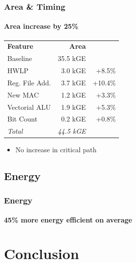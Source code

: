 \documentclass{beamer}
\newcommand\drawbar[1]{%
  \begin{tikzpicture}%
    \draw[fill=#1,draw=black!90,ultra thin] (0pt,0pt) rectangle (3pt,8pt);%
    \draw[fill=#1,draw=black!90,ultra thin] (6pt,0pt) rectangle (9pt,6pt);%
  \end{tikzpicture}\hspace{0pt}%
}
\begin{document}
\begin{frame}
  \frametitle{Area \& Timing}
  \framesubtitle{Area increase by 25\%}
  \begin{minipage}[c][5cm]{0.58\linewidth}
    \begin{tabular}{@{}lrr@{}}
      \textbf{Feature}  & \textbf{Area}    & \\ \Xhline{2\arrayrulewidth}
      \drawbar{gray!20}   Baseline         & 35.5 kGE &         \\ \hline
      \drawbar{blue!60}   HWLP             &  3.0 kGE &  +8.5\%   \\ \hline
      \drawbar{blue!60}   Reg. File Add.   &  3.7 kGE & +10.4\%   \\ \hline
      \drawbar{red!60}    New MAC          &  1.2 kGE &  +3.3\%   \\ \hline
      \drawbar{orange!60} Vectorial ALU    &  1.9 kGE &  +5.3\%   \\ \hline
      \drawbar{green!60}  Bit Count        &  0.2 kGE &  +0.8\%   \\ \Xhline{3\arrayrulewidth}
                          \textit{Total}   & \textit{44.5 kGE} & 
    \end{tabular}
    \vfill
    \begin{itemize}
      \item No increase in critical path
    \end{itemize}
  \end{minipage}
  \hfill
  \begin{minipage}[c][5cm]{0.36\linewidth}
    
  \end{minipage}
\end{frame}



\subsection{Energy}

\begin{frame}
  \frametitle{Energy}
  \framesubtitle{45\% more energy efficient on average}
  \vfill
  
  \vfill
\end{frame}


\section{Conclusion}
\end{document}
